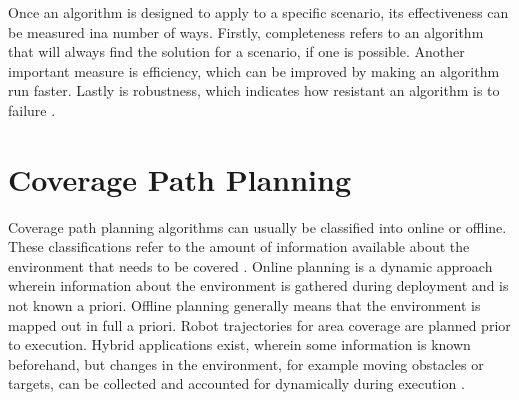 
Once an algorithm is designed to apply to a specific scenario, its effectiveness can be measured ina  number of ways. Firstly, completeness refers to an algorithm that will always find the solution for a scenario, if one is possible\cite{Lavalle2006}. Another important measure is efficiency, which can be improved by making an algorithm run faster. Lastly is robustness, which indicates how resistant an algorithm is to failure \cite{Hazon2005}. 
\section{Coverage Path Planning}
Coverage path planning algorithms can usually be classified into online or offline. These classifications refer to the amount of information available about the environment that needs to be covered \cite{CPP-Survey-2019}. Online planning is a dynamic approach wherein information about the environment is gathered during deployment and is not known a priori. Offline planning generally means that the environment is mapped out in full a priori. Robot trajectories for area coverage are planned prior to execution. Hybrid applications exist, wherein some information is known beforehand, but changes in the environment, for example moving obstacles or targets, can be collected and accounted for dynamically during execution \cite{Kamrani2014}.

